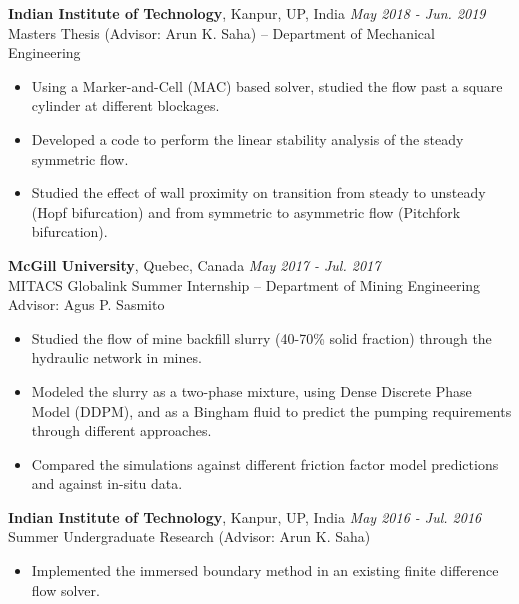 \documentclass[11pt]{article}
\begin{document}
\vspace{4mm}

\noindent\textbf{Indian Institute of Technology}, Kanpur, UP, India \hfill \textit{May 2018 - Jun. 2019} \\
Masters Thesis (Advisor: Arun K. Saha) – Department of Mechanical Engineering
\begin{itemize}[leftmargin=*,itemsep=1pt]
    \item Using a Marker-and-Cell (MAC) based solver, studied the flow past a square cylinder at different blockages.
    \item Developed a code to perform the linear stability analysis of the steady symmetric flow.
    \item Studied the effect of wall proximity on transition from steady to unsteady (Hopf bifurcation) and from symmetric to asymmetric flow (Pitchfork bifurcation).
\end{itemize}

\vspace{4mm}

\noindent\textbf{McGill University}, Quebec, Canada \hfill \textit{May 2017 - Jul. 2017} \\
MITACS Globalink Summer Internship – Department of Mining Engineering \\
Advisor: Agus P. Sasmito
\begin{itemize}[leftmargin=*,itemsep=1pt]
    \item Studied the flow of mine backfill slurry (40-70\% solid fraction) through the hydraulic network in mines.
    \item Modeled the slurry as a two-phase mixture, using Dense Discrete Phase Model (DDPM), and as a Bingham fluid to predict the pumping requirements through different approaches.
    \item Compared the simulations against different friction factor model predictions and against in-situ data.
\end{itemize}

\vspace{4mm}

\noindent\textbf{Indian Institute of Technology}, Kanpur, UP, India \hfill \textit{May 2016 - Jul. 2016} \\
Summer Undergraduate Research (Advisor: Arun K. Saha)
\begin{itemize}[leftmargin=*,itemsep=1pt]
    \item Implemented the immersed boundary method in an existing finite difference flow solver.
\end{itemize}
\end{document}
